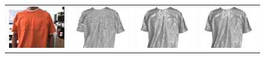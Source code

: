 \begin{figure}[!ht]
\centering
\setlength{\tabcolsep}{0.1em} %
 {\renewcommand{\arraystretch}{0.6}%
\begin{tabular}{c|c c c}
   \includegraphics[height = 0.19\linewidth]{figures/methodology/rgbd_body_rgb.pdf} \hspace{0.05cm}
   &
   \includegraphics[height = 0.19\linewidth]{figures/methodology/rgbd_body_shape_init.pdf} &
   \includegraphics[height = 0.19\linewidth]{figures/methodology/rgbd_body_shape_smooth.pdf} &
   \includegraphics[height = 0.19\linewidth]{figures/methodology/rgbd_body_shape.pdf} \\
   

\end{tabular}}
\end{figure}
